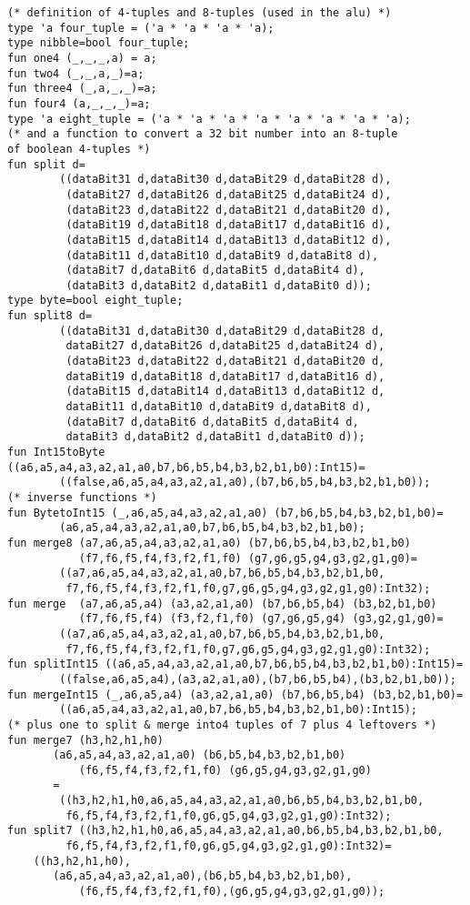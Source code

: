 \begin{verbatim}
(* definition of 4-tuples and 8-tuples (used in the alu) *)
type 'a four_tuple = ('a * 'a * 'a * 'a);
type nibble=bool four_tuple;
fun one4 (_,_,_,a) = a;
fun two4 (_,_,a,_)=a;
fun three4 (_,a,_,_)=a;
fun four4 (a,_,_,_)=a;
type 'a eight_tuple = ('a * 'a * 'a * 'a * 'a * 'a * 'a * 'a);
(* and a function to convert a 32 bit number into an 8-tuple
of boolean 4-tuples *)
fun split d=
        ((dataBit31 d,dataBit30 d,dataBit29 d,dataBit28 d),
         (dataBit27 d,dataBit26 d,dataBit25 d,dataBit24 d),
         (dataBit23 d,dataBit22 d,dataBit21 d,dataBit20 d),
         (dataBit19 d,dataBit18 d,dataBit17 d,dataBit16 d),
         (dataBit15 d,dataBit14 d,dataBit13 d,dataBit12 d),
         (dataBit11 d,dataBit10 d,dataBit9 d,dataBit8 d),
         (dataBit7 d,dataBit6 d,dataBit5 d,dataBit4 d),
         (dataBit3 d,dataBit2 d,dataBit1 d,dataBit0 d));
type byte=bool eight_tuple;
fun split8 d=
        ((dataBit31 d,dataBit30 d,dataBit29 d,dataBit28 d,
         dataBit27 d,dataBit26 d,dataBit25 d,dataBit24 d),
         (dataBit23 d,dataBit22 d,dataBit21 d,dataBit20 d,
         dataBit19 d,dataBit18 d,dataBit17 d,dataBit16 d),
         (dataBit15 d,dataBit14 d,dataBit13 d,dataBit12 d,
         dataBit11 d,dataBit10 d,dataBit9 d,dataBit8 d),
         (dataBit7 d,dataBit6 d,dataBit5 d,dataBit4 d,
         dataBit3 d,dataBit2 d,dataBit1 d,dataBit0 d));
fun Int15toByte ((a6,a5,a4,a3,a2,a1,a0,b7,b6,b5,b4,b3,b2,b1,b0):Int15)=
        ((false,a6,a5,a4,a3,a2,a1,a0),(b7,b6,b5,b4,b3,b2,b1,b0));
(* inverse functions *)
fun BytetoInt15 (_,a6,a5,a4,a3,a2,a1,a0) (b7,b6,b5,b4,b3,b2,b1,b0)=
        (a6,a5,a4,a3,a2,a1,a0,b7,b6,b5,b4,b3,b2,b1,b0);
fun merge8 (a7,a6,a5,a4,a3,a2,a1,a0) (b7,b6,b5,b4,b3,b2,b1,b0)
           (f7,f6,f5,f4,f3,f2,f1,f0) (g7,g6,g5,g4,g3,g2,g1,g0)=
        ((a7,a6,a5,a4,a3,a2,a1,a0,b7,b6,b5,b4,b3,b2,b1,b0,
         f7,f6,f5,f4,f3,f2,f1,f0,g7,g6,g5,g4,g3,g2,g1,g0):Int32);
fun merge  (a7,a6,a5,a4) (a3,a2,a1,a0) (b7,b6,b5,b4) (b3,b2,b1,b0)
           (f7,f6,f5,f4) (f3,f2,f1,f0) (g7,g6,g5,g4) (g3,g2,g1,g0)=
        ((a7,a6,a5,a4,a3,a2,a1,a0,b7,b6,b5,b4,b3,b2,b1,b0,
         f7,f6,f5,f4,f3,f2,f1,f0,g7,g6,g5,g4,g3,g2,g1,g0):Int32);
fun splitInt15 ((a6,a5,a4,a3,a2,a1,a0,b7,b6,b5,b4,b3,b2,b1,b0):Int15)=
        ((false,a6,a5,a4),(a3,a2,a1,a0),(b7,b6,b5,b4),(b3,b2,b1,b0));
fun mergeInt15 (_,a6,a5,a4) (a3,a2,a1,a0) (b7,b6,b5,b4) (b3,b2,b1,b0)=
        ((a6,a5,a4,a3,a2,a1,a0,b7,b6,b5,b4,b3,b2,b1,b0):Int15);
(* plus one to split & merge into4 tuples of 7 plus 4 leftovers *)
fun merge7 (h3,h2,h1,h0)
	   (a6,a5,a4,a3,a2,a1,a0) (b6,b5,b4,b3,b2,b1,b0)
           (f6,f5,f4,f3,f2,f1,f0) (g6,g5,g4,g3,g2,g1,g0)
	   =
        ((h3,h2,h1,h0,a6,a5,a4,a3,a2,a1,a0,b6,b5,b4,b3,b2,b1,b0,
         f6,f5,f4,f3,f2,f1,f0,g6,g5,g4,g3,g2,g1,g0):Int32);
fun split7 ((h3,h2,h1,h0,a6,a5,a4,a3,a2,a1,a0,b6,b5,b4,b3,b2,b1,b0,
         f6,f5,f4,f3,f2,f1,f0,g6,g5,g4,g3,g2,g1,g0):Int32)=
	((h3,h2,h1,h0),
	   (a6,a5,a4,a3,a2,a1,a0),(b6,b5,b4,b3,b2,b1,b0),
           (f6,f5,f4,f3,f2,f1,f0),(g6,g5,g4,g3,g2,g1,g0));
\end{verbatim}
